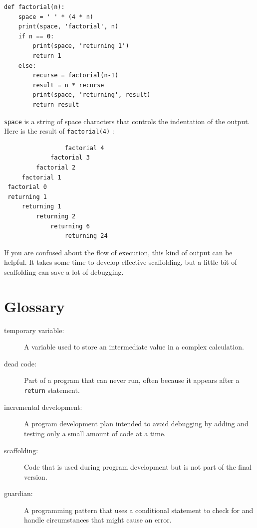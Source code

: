 \documentclass[10pt]{book}
\begin{document}
\begin{verbatim}
def factorial(n):
    space = ' ' * (4 * n)
    print(space, 'factorial', n)
    if n == 0:
        print(space, 'returning 1')
        return 1
    else:
        recurse = factorial(n-1)
        result = n * recurse
        print(space, 'returning', result)
        return result
\end{verbatim}
%
{\tt space} is a string of space characters that controls the
indentation of the output.  Here is the result of {\tt factorial(4)} :

\begin{verbatim}
                 factorial 4
             factorial 3
         factorial 2
     factorial 1
 factorial 0
 returning 1
     returning 1
         returning 2
             returning 6
                 returning 24
\end{verbatim}
%
If you are confused about the flow of execution, this kind of
output can be helpful.  It takes some time to develop effective
scaffolding, but a little bit of scaffolding can save a lot of debugging.


\section{Glossary}

\begin{description}

\item[temporary variable:]  A variable used to store an intermediate value in
a complex calculation.

\item[dead code:]  Part of a program that can never run, often because
it appears after a {\tt return} statement.

\item[incremental development:]  A program development plan intended to
avoid debugging by adding and testing only
a small amount of code at a time.

\item[scaffolding:]  Code that is used during program development but is
not part of the final version.

\item[guardian:]  A programming pattern that uses a conditional
statement to check for and handle circumstances that
might cause an error.

\end{description}
\end{document}
